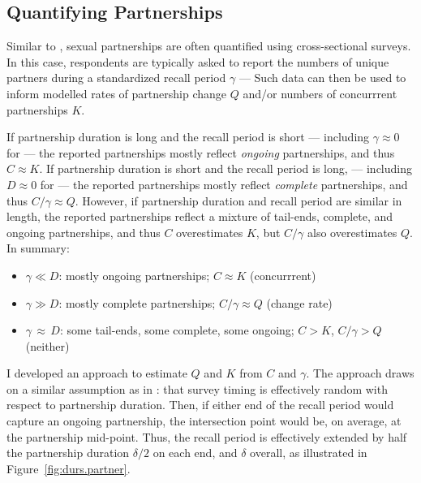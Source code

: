 \subsection{Quantifying Partnerships}\label{app.math.dur.qp}
Similar to ,
sexual partnerships are often quantified using cross-sectional surveys.
In this case, respondents are typically asked to report the numbers of unique partners
during a standardized recall period $\gamma$ --- \eg
{}
Such data can then be used to inform modelled
rates of partnership change $Q$ and/or numbers of concurrrent partnerships $K$.
\par
If partnership duration is long and the recall period is short
--- including $\gamma \approx 0$ for
 ---
the reported partnerships mostly reflect \emph{ongoing} partnerships,
and thus $C \approx K$.
If partnership duration is short and the recall period is long,
--- including $D \approx 0$ for
 ---
the reported partnerships mostly reflect \emph{complete} partnerships,
and thus $C/\gamma \approx Q$.
However, if partnership duration and recall period are similar in length,
the reported partnerships reflect a mixture of tail-ends, complete, and ongoing partnerships,
and thus $C$ overestimates $K$, but $C/\gamma$ also overestimates $Q$.
In summary:
\begin{itemize}
  \item $\gamma \ll D$: mostly ongoing partnerships;
  $C \approx K$ (concurrrent)
  \item $\gamma \gg D$: mostly complete partnerships;
  $C/\gamma \approx Q$ (change rate)
  \item $\gamma\,\approx\,D$: some tail-ends, some complete, some ongoing;
  $C > K$, $C/\gamma > Q$ (neither)
\end{itemize}
\par
I developed an approach to estimate $Q$ and $K$ from $C$ and $\gamma$.
The approach draws on a similar assumption as in :
that survey timing is effectively random with respect to partnership duration.
Then, if either end of the recall period would capture an ongoing partnership,
the intersection point would be, on average, at the partnership mid-point.
Thus, the recall period is effectively extended
by half the partnership duration $\delta/2$ on each end, and $\delta$ overall,
as illustrated in Figure~\ref{fig:durs.partner}.
